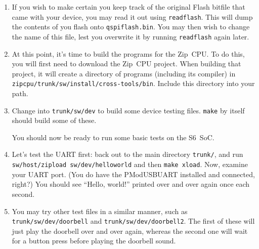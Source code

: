 \documentclass{gqtekspec}
\begin{document}
\begin{enumerate}
	As examples, if you type {\tt wbregs version} you should be able
	to read the version (a.k.a. build date) from the currently installed
	.bit file.  Likewise if you type {\tt wbregs uart 65}, you should see
	an `A' (i.e. a 65) sent from the S6~SoC over the serial port. 
	{\tt wbregs uart} by itself will read a single character from the
	serial port and so on.

	You should be able to test all of your peripherals by hand using
	{\tt wbregs}: GPIO, Flash, UART, keypad, buttons, LEDs, Interrupt
	controller, timer, etc.\footnote{The display and audio devices may be
	more difficult since these require multiple interactions over the
	course of a short period of time to work.}  This should give you some
	confidence in how these peripherals work, should you need it.  You
	may also use this time to verify that your wiring is properly set up.

\item If you wish to make certain you keep track of the original Flash bitfile
	that came with your device, you may read it out using {\tt readflash}.
	This will dump the contents of you flash onto {\tt qspiflash.bin}.
	You may then wish to change the name of this file, lest you overwrite
	it by running {\tt readflash} again later.

\item At this point, it's time to build the programs for the Zip~CPU.  To do
	this, you will first need to download the Zip~CPU project.  When 
	building that project, it will create a directory of programs
	(including its compiler) in
	{\tt zipcpu/trunk/sw/install/cross-tools/bin}. 
	Include this directory into your path.

\item Change into {\tt trunk/sw/dev} to build some device testing files.
	{\tt make} by itself should build some of these.

	You should now be ready to run some basic tests on the S6~SoC.

\item Let's test the UART first: back out to the main directory {\tt trunk/},
	and run\break
	{\tt sw/host/zipload sw/dev/helloworld} and then {\tt make xload}.
	Now, examine your UART port.  (You do have the PModUSBUART installed
	and connected, right?)  You should see ``Hello, world!'' printed
	over and over again once each second.

\item You may try other test files in a similar manner, such as 
	{\tt trunk/sw/dev/doorbell} and\break
	{\tt trunk/sw/dev/doorbell2}.  The first of these will just play the
	doorbell over and over again, whereas the second one will wait for a 
	button press before playing the doorbell sound.


\end{enumerate}
\end{document}
